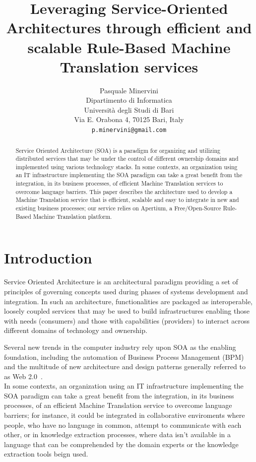 \documentclass[11pt]{article}
\title{Leveraging Service-Oriented Architectures through efficient and scalable Rule-Based Machine Translation services}
\author{Pasquale Minervini\\
  Dipartimento di Informatica\\
  Università degli Studi di Bari\\
  Via E. Orabona 4, 70125 Bari, Italy\\
  {\tt p.minervini@gmail.com}}
\date{}
\begin{document}
\maketitle

\begin{abstract}
Service Oriented Architecture (SOA) is a paradigm for organizing and utilizing distributed services that may be under the  control of different ownership domains and implemented using various technology stacks. In some contexts, an organization using an IT infrastructure implementing the SOA paradigm can take a great benefit from the integration, in its business processes, of efficient Machine Translation services to overcome language barriers. This paper describes the architecture used to develop a Machine Translation service that is efficient, scalable and easy to integrate in new and existing business processes; our service relies on Apertium, a Free/Open-Source Rule-Based Machine Translation platform.
\end{abstract}


\section{Introduction}

Service Oriented Architecture is an architectural paradigm providing a set of principles of governing concepts used during phases of systems development and integration. In such an architecture, functionalities are packaged as interoperable, loosely coupled services that may be used to build infrastructures enabling those with needs (consumers) and those with capabilities (providers) to interact across different domains of technology and ownership.

Several new trends in the computer industry rely upon SOA as the enabling foundation, including the automation of Business Process Management (BPM) and the multitude of new architecture and design patterns generally referred to as Web 2.0~\citep{web20}.\\

In some contexts, an organization using an IT infrastructure implementing the SOA paradigm can take a great benefit from the integration, in its business processes, of an efficient Machine Translation service to overcome language barriers; for instance, it could be integrated in collaborative enviroments where people, who have no language in common, attempt to communicate with each other, or in knowledge extraction processes, where data isn't available in a language that can be comprehended by the domain experts or the knowledge extraction tools beign used.
\end{document}

